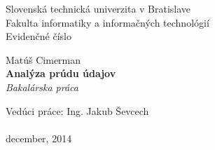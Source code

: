\documentclass[11pt, a4paper, titlepage, slovak]{book}
\begin{document}
\sloppy %




\frontmatter

\begin{titlepage}
\begin{center}                                                                                                                                                   
{\Large Slovenská technická univerzita v Bratislave} \\
{\Large Fakulta informatiky a informačných technológií} \\
\vspace*{1\baselineskip}
\large {Evidenčné číslo}
\vfill %

\newpage

{{Matúš Cimerman}} \\
\vspace*{1\baselineskip}
{\huge {\textbf{Analýza prúdu údajov}}} %
\\
\vspace*{1\baselineskip}
\textit{Bakalárska práca}\\
\vfill %
\end{center}
{Vedúci práce: Ing. Jakub Ševcech}\\
\\
{december, 2014}
\end{titlepage}
\emptydoublepage
\end{document}
